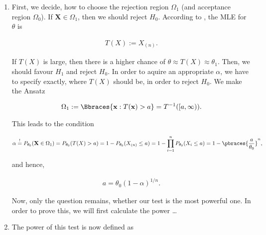 \begin{solution}

\phantom{}

\begin{enumerate}[label = (\alph*)]

    \item First, we decide, how to choose the rejection region $\Omega_1$ (and acceptance region $\Omega_0$).
    If $\mathbf X \in \Omega_1$, then we should reject $H_0$.
    According to \cite[lecture 6, slide 69]{EStat}, the MLE for $\theta$ is

    \begin{align*}
        T(X) := X_{(n)}.
    \end{align*}

    If $T(X)$ is large, then there is a higher chance of $\theta \approx T(X) \approx \theta_1$.
    Then, we should favour $H_1$ and reject $H_0$.
    In order to aquire an appropriate $\alpha$, we have to specify exactly, where $T(X)$ should be, in order to reject $H_0$.
    We make the Ansatz

    \begin{align*}
        \Omega_1
        :=
        \Bbraces{\mathbf x: T(\mathbf x) > a}
        =
        T^{-1}([a, \infty)).
    \end{align*}

    This leads to the condition

    \begin{align*}
        \alpha
        \stackrel{!}{=}
        P_{\theta_0}(\mathbf X \in \Omega_1)
        =
        P_{\theta_0}(T(X) > a)
        =
        1 - P_{\theta_0}(X_{(n)} \leq a)
        =
        1 - \prod_{i=1}^n P_{\theta_0}(X_i \leq a)
        =
        1 - \pbraces{\frac{a}{\theta_0}}^n,
    \end{align*}

    and hence,

    \begin{align*}
        a = \theta_0 (1 - \alpha)^{1/n}.
    \end{align*}

    Now, only the question remains, whether our test is the most powerful one.
    In order to prove this, we will first calculate the power \dots

    \item The power of this test is now defined as


\end{enumerate}
\end{solution}
